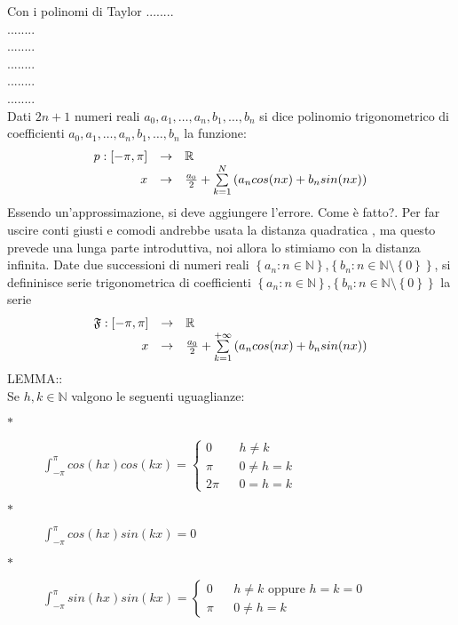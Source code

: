 \observation
Con i polinomi di Taylor ........\\
........\\
........\\
........\\
........\\
........\\
Dati $2n+1$ numeri reali $a_0,a_1,\ldots,a_n,b_1,\ldots,b_n$ si dice polinomio trigonometrico di coefficienti $a_0,a_1,\ldots,a_n,b_1,\ldots,b_n$ la funzione:
$$\begin{array}{rcl} p: \left[-\pi,\pi\right] & \to &  \mathbb{R} \\ x & \to & \frac{a_0}{2}+\sum\limits_{k=1}^{N}\left(a_ncos(nx)+b_nsin(nx)\right) \end{array}$$
\observation
Essendo un'approssimazione, si deve aggiungere l'errore. Come è fatto?. Per far uscire conti giusti e comodi andrebbe usata la distanza quadratica , ma questo prevede una lunga parte introduttiva, noi allora lo stimiamo con la distanza infinita.
Date due successioni di numeri reali $\left\{a_n:n\in\mathbb{N}\right\}$,$\left\{b_n:n\in\mathbb{N}\setminus\left\{0\right\}\right\}$, si defininisce serie trigonometrica di coefficienti  $\left\{a_n:n\in\mathbb{N}\right\}$,$\left\{b_n:n\in\mathbb{N}\setminus\left\{0\right\}\right\}$ la serie
$$\begin{array}{rcl} \mathfrak{F}: \left[-\pi,\pi\right] & \to &  \mathbb{R} \\ x & \to & \frac{a_0}{2}+\sum\limits_{k=1}^{+\infty}\left(a_ncos(nx)+b_nsin(nx)\right) \end{array}$$
LEMMA::\\
Se $h,k\in\mathbb{N}$ valgono le seguenti uguaglianze:
\begin{description}
	\item[$\ast$] 
	$\int_{-\pi}^{\pi} cos(hx)cos(kx)=
	\left\{\begin{matrix}
	0 &&h\ne k\\\pi&&0\ne h=k\\2\pi&&0=h=k
	\end{matrix}\right.$
	\item[$\ast$] $\int_{-\pi}^{\pi}cos(hx)sin(kx)= 0 $
	\item[$\ast$] 
	$\int_{-\pi}^{\pi}sin(hx)sin(kx)=
	\left\{\begin{matrix}
	0 &&h\ne k\text{ oppure }h=k=0\\ \pi&&0\ne h=k
	\end{matrix}\right.$
\end{description}
